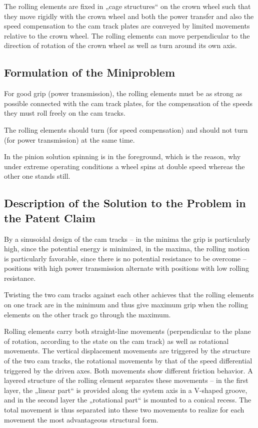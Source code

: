 \documentclass[11pt,a4paper]{article}
\begin{document}
The rolling elements are fixed in „cage structures“ on the crown wheel such
that they move rigidly with the crown wheel and both the power transfer and
also the speed compensation to the cam track plates are conveyed by limited
movements relative to the crown wheel. The rolling elements can move
perpendicular to the direction of rotation of the crown wheel as well as turn
around its own axis.
  
\subsection{Formulation of the Miniproblem}

For good grip (power transmission), the rolling elements must be as strong as
possible connected with the cam track plates, for the compensation of the
speeds they must roll freely on the cam tracks.

The rolling elements should turn (for speed compensation) and should not turn
(for power transmission) at the same time.

In the pinion solution spinning is in the foreground, which is the reason,
why under extreme operating conditions a wheel spins at double speed whereas
the other one stands still.

\subsection{Description of the Solution to the Problem in the Patent
  Claim} 

By a sinusoidal design of the cam tracks -- in the minima the grip is
particularly high, since the potential energy is minimized, in the maxima, the
rolling motion is particularly favorable, since there is no potential
resistance to be overcome -- positions with high power transmission alternate
with positions with low rolling resistance.

Twisting the two cam tracks against each other achieves that the rolling
elements on one track are in the minimum and thus give maximum grip when the
rolling elements on the other track go through the maximum.

Rolling elements carry both straight-line movements (perpendicular to the
plane of rotation, according to the state on the cam track) as well as
rotational movements. The vertical displacement movements are triggered by the
structure of the two cam tracks, the rotational movements by that of the speed
differential triggered by the driven axes.  Both movements show different
friction behavior. A layered structure of the rolling element separates these
movements -- in the first layer, the „linear part“ is provided along the
system axis in a V-shaped groove, and in the second layer the „rotational
part“ is mounted to a conical recess. The total movement is thus separated
into these two movements to realize for each movement the most advantageous
structural form.
\end{document}
